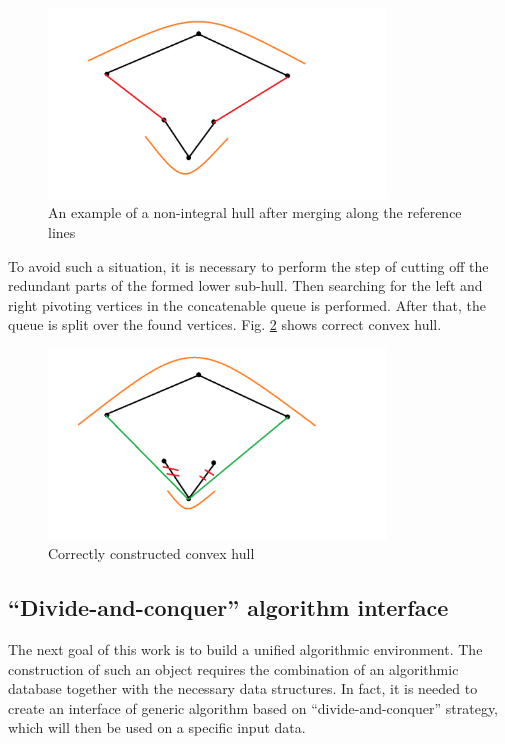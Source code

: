 \documentclass[a4paper,UKenglish,cleveref, autoref]{socg-lipics-v2019}
\begin{document}
	\begin{figure}[t]
		\centering
		\includegraphics[width=0.8\textwidth, height=0.3\textheight]{incorect_lower_subhull}
		\caption{An example of a non-integral hull after merging along the reference lines}
		\label{fig:incorect_lower_subhull}
	\end{figure}
	
	To avoid such a situation, it is necessary to perform the step of cutting off the redundant parts of the formed lower sub-hull. Then searching for the left and right pivoting vertices in the concatenable queue is performed. After that, the queue is split over the found vertices. Fig. \ref{fig:correct_convex_hull} shows correct convex hull.
	
	\begin{figure}[t]
		\centering
		\includegraphics[width=0.8\textwidth, height=0.3\textheight]{correct_convex_hull}
		\caption{Correctly constructed convex hull}
		\label{fig:correct_convex_hull}
	\end{figure}



\subsection{``Divide-and-conquer'' algorithm interface}


	The next goal of this work is to build a unified algorithmic environment. The construction of such an object requires the combination of an algorithmic database together with the necessary data structures.  In fact, it is needed to create an interface of generic algorithm based on ``divide-and-conquer'' strategy, which will then be used on a specific input data.
	
\end{document}
